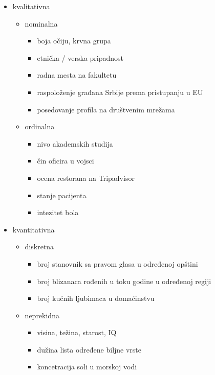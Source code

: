 \documentclass[10pt,a4paper,]{article}
\begin{document}
\begin{itemize}
	\item kvalitativna
	\begin{itemize}
		\item nominalna
			\begin{itemize}
				\item boja očiju, krvna grupa
				\item etnička / verska pripadnost 
				\item radna mesta na fakultetu
				\item raspoloženje građana Srbije prema pristupanju
				u EU
				\item posedovanje profila na društvenim mrežama
			\end{itemize}
		\item ordinalna
			\begin{itemize}
				\item nivo akademskih studija
				\item čin oficira u vojsci
				\item ocena restorana na Tripadvisor
				\item stanje pacijenta
				\item intezitet bola
			\end{itemize}
	\end{itemize}
	\item kvantitativna
	\begin{itemize}
		\item diskretna
			\begin{itemize}
				\item broj stanovnik sa pravom glasa u određenoj
				opštini
				\item broj blizanaca rođenih u toku godine u
				određenoj regiji
				\item broj kućnih ljubimaca u domaćinstvu
			\end{itemize}
		\item neprekidna
			\begin{itemize}
				\item visina, težina, starost, IQ
				\item dužina lista određene biljne vrste
				\item koncetracija soli u morskoj vodi
			\end{itemize}
	\end{itemize}
\end{itemize}
\end{document}
